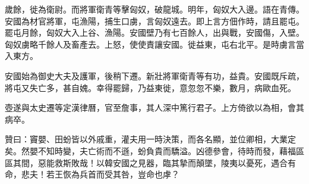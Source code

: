 \begin{pinyinscope}
歲餘，徙為衛尉。而將軍衛青等擊匈奴，破龍城。明年，匈奴大入邊。語在青傳。安國為材官將軍，屯漁陽，捕生口虜，言匈奴遠去。即上言方佃作時，請且罷屯。罷屯月餘，匈奴大入上谷、漁陽。安國壁乃有七百餘人，出與戰，安國傷，入壁。匈奴虜略千餘人及畜產去。上怒，使使責讓安國。徙益東，屯右北平。是時虜言當入東方。

安國始為御史大夫及護軍，後稍下遷。新壯將軍衛青等有功，益貴。安國既斥疏，將屯又失亡多，甚自媿。幸得罷歸，乃益東徙，意忽忽不樂，數月，病歐血死。

壺遂與太史遷等定漢律曆，官至詹事，其人深中篤行君子。上方倚欲以為相，會其病卒。

贊曰：竇嬰、田蚡皆以外戚重，灌夫用一時決策，而各名顯，並位卿相，大業定矣。然嬰不知時變，夫亡術而不遜，蚡負貴而驕溢。凶德參會，待時而發，藉福區區其間，惡能救斯敗哉！以韓安國之見器，臨其摯而顛墜，陵夷以憂死，遇合有命，悲夫！若王恢為兵首而受其咎，豈命也虖？


\end{pinyinscope}
